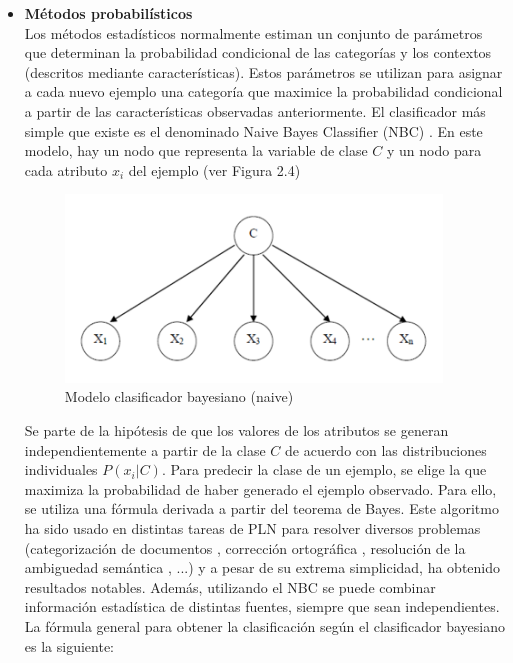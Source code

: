 \begin{itemize}
  \item \textbf{Métodos probabilísticos} \\
  Los métodos estadísticos normalmente estiman un conjunto de parámetros que determinan la probabilidad condicional de las categorías y los contextos (descritos mediante características). Estos parámetros se utilizan para asignar a cada nuevo ejemplo una categoría que maximice la probabilidad condicional a partir de las características observadas anteriormente. El clasificador más simple que existe es el denominado Naive Bayes Classifier (NBC) \cite{020}. En este modelo, hay un nodo que representa la variable de clase $C$ y un nodo para cada atributo $x_i$ del ejemplo (ver Figura 2.4)

  \begin{figure}[h!]
    \begin{center}
    \includegraphics[angle=0, width=10cm]{Graficos/bayesiano}
    \caption{Modelo clasificador bayesiano (naive) \cite{001}}
    \label{fig:bayesiano}
    \end{center}
  \end{figure}
  Se parte de la hipótesis de que los valores de los atributos se generan independientemente a partir de la clase $C$ de acuerdo con las distribuciones individuales $P(x_i|C)$. Para predecir la clase de un ejemplo, se elige la que maximiza la probabilidad de haber generado el ejemplo observado. Para ello, se utiliza una fórmula derivada a partir del teorema de Bayes. Este algoritmo ha sido usado en distintas tareas de PLN para resolver diversos problemas (categorización de documentos \cite{021}, corrección ortográfica \cite{022}, resolución de la ambiguedad semántica \cite{023}, \cite{024} ...) y a pesar de su extrema simplicidad, ha obtenido resultados notables. Además, utilizando el NBC se puede combinar información estadística de distintas fuentes, siempre que sean independientes. La fórmula general para obtener la clasificación según el clasificador bayesiano es la siguiente:


\end{itemize}
